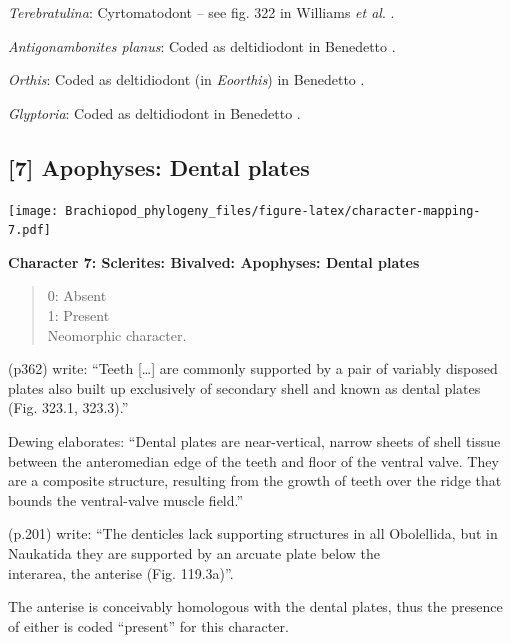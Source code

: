 \documentclass[openany]{book}
\theoremstyle{definition}
\theoremstyle{definition}
\theoremstyle{definition}
\theoremstyle{remark}
\begin{document}
\emph{Terebratulina}: Cyrtomatodont -- see fig. 322 in Williams \emph{et
al}. \citeyearpar{Williams2000BrachiopodaLinguliformea}.

\emph{Antigonambonites planus}: Coded as deltidiodont in Benedetto
\citeyearpar{Benedetto2009iChaniella}.

\emph{Orthis}: Coded as deltidiodont (in \emph{Eoorthis}) in Benedetto
\citeyearpar{Benedetto2009iChaniella}.

\emph{Glyptoria}: Coded as deltidiodont in Benedetto
\citeyearpar{Benedetto2009iChaniella}.

\hypertarget{apophyses-dental-plates}{%
\subsection*{{[}7{]} Apophyses: Dental
plates}\label{apophyses-dental-plates}}

\texttt{[image: Brachiopod\_phylogeny\_files/figure-latex/character-mapping-7.pdf]}

\textbf{Character 7: Sclerites: Bivalved: Apophyses: Dental plates}

\begin{quote}
0: Absent\\
1: Present\\
Neomorphic character.
\end{quote}

\citet{Williams1997BrachiopodaRevised} (p362) write: ``Teeth
{[}\ldots{}{]} are commonly supported by a pair of variably disposed
plates also built up exclusively of secondary shell and known as dental
plates (Fig. 323.1, 323.3).''

Dewing \citeyearpar{Dewing2001Hingemodifications} elaborates: ``Dental
plates are near-vertical, narrow sheets of shell tissue between the
anteromedian edge of the teeth and floor of the ventral valve. They are
a composite structure, resulting from the growth of teeth over the ridge
that bounds the ventral-valve muscle field.''

\citet{Williams2000BrachiopodaLinguliformea} (p.201) write: ``The
denticles lack supporting structures in all Obolellida, but in Naukatida
they are supported by an arcuate plate below the\\
interarea, the anterise (Fig. 119.3a)''.

The anterise is conceivably homologous with the dental plates, thus the
presence of either is coded ``present'' for this character.
\end{document}
